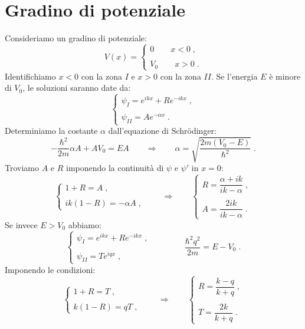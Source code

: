 \documentclass[10pt,a4paper]{report}
\theoremstyle{definition}
\numberwithin{equation}{section}
\newcommand{\Sch}{Schrödinger}
\begin{document}
\section{Gradino di potenziale}
Consideriamo un gradino di potenziale:
\begin{equation}
V(x)=\begin{cases}
0 \qquad x<0\;, \\
\\
V_0 \qquad x>0\;.
\end{cases}
\end{equation}
Identifichiamo $x<0$ con la zona $I$ e $x>0$ con la zona $II$. Se l'energia $E$ è minore di $V_0$, le soluzioni saranno date da:
\begin{equation}
\begin{cases}
\psi_I=e^{ikx}+Re^{-ikx}\;, \\
\\
\psi_{II}=Ae^{-\alpha x}\;.
\end{cases}
\end{equation}
Determiniamo la costante $\alpha$ dall'equazione di \Sch:
$$
-\frac{\hbar^2}{2m}\alpha A+AV_0=EA \qquad \Longrightarrow \qquad \alpha=\sqrt{\frac{2m(V_0-E)}{\hbar^2}}\;.
$$
Troviamo $A$ e $R$ imponendo la continuità di $\psi$ e $\psi'$ in $x=0$:
\begin{equation}
\begin{cases}
1+R=A\;, \\
\\
ik(1-R)=-\alpha A\;,
\end{cases} \qquad \Longrightarrow \qquad
\begin{cases}
R=\dfrac{\alpha+ik}{ik-\alpha}\;, \\
\\
A=\dfrac{2ik}{ik-\alpha}\;.
\end{cases}
\end{equation}
Se invece $E>V_0$ abbiamo:
\begin{equation}
\begin{cases}
\psi_I=e^{ikx}+Re^{-ikx}\;, \\
\\
\psi_{II}=Te^{iqx}\;,
\end{cases} \qquad\qquad \frac{\hbar^2 q^2}{2m}=E-V_0\;.
\end{equation}
Imponendo le condizioni:
\begin{equation}
\begin{cases}
1+R=T\;, \\
\\
k(1-R)=qT\;,
\end{cases}\qquad \Longrightarrow\qquad 
\begin{cases}
R=\dfrac{k-q}{k+q}\;, \\
\\
T=\dfrac{2k}{k+q}\;.
\end{cases}
\end{equation}
\end{document}
